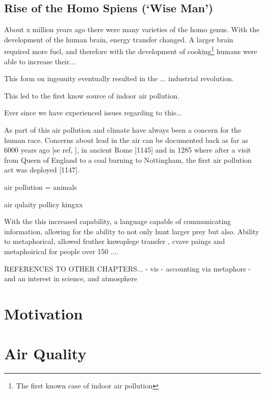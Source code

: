 \subsection{Rise of the Homo Spiens (`Wise Man')}
About x million years ago there were many varieties of the homo genus. With the development of the human brain, energy transfer changed. A larger brain required more fuel, and therefore with the development of cooking\footnote{The first known case of indoor air pollution} humans were able to increase their...

This form on ingenuity eventually resulted in the ... industrial revolution.


This led to the first know source of indoor air pollution.

Ever since we have experienced issues regarding to this...




As part of this air pollution and climate have always been a concern for the human race. Concerns about lead in the air can be documented back as far as 6000 years ago [se ref, ], in ancient Rome [1145] and in 1285 where after a visit from Queen of England to a coal burning to Nottingham, the first air pollution act was deployed [1147].

air pollution = animals

air qulaity pollicy
kingxx



With the this increased capability, a language capable of communicating information, allowing for the ability to not only hunt larger prey but also.
Ability to metaphorical, allowed fruther knwoplege transfer , cvave paings and metaphoirical for people over 150 ....

REFERENCES TO OTHER CHAPTERS...
- vis
- accounting via metaphors
- and an interest in science, and atmosphere

\section{Motivation}



\section{Air Quality}


